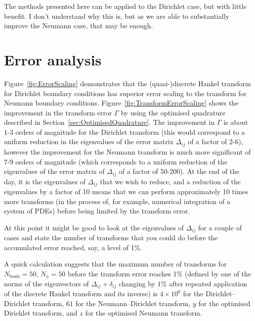 \documentclass[aip,amsmath,amssymb,reprint,twocolumn]{revtex4-1}
\newcommand{\Nbasis}{{N_{\text{basis}}}}
\newcommand{\Nx}{{N_{x}}}
\begin{document}
The methods presented here can be applied to the Dirichlet case, but with little benefit.  I don't understand why this is, but as we are able to substantially improve the Neumann case, that may be enough.



\section{Error analysis}
\label{sec:ErrorAnalysis}

Figure~\ref{fig:ErrorScaling} demonstrates that the (quasi-)discrete Hankel transform for Dirichlet boundary conditions has superior error scaling to the transform for Neumann boundary conditions.  Figure~\ref{fig:TransformErrorScaling} shows the improvement in the transform error $\Gamma$ by using the optimised quadrature described in Section~\ref{sec:OptimisedQuadrature}.  The improvement in $\Gamma$ is about 1-3 orders of magnitude for the Dirichlet transform (this would correspond to a uniform reduction in the eigenvalues of the error matrix $\Delta_{ij}$ of a factor of 2-6), however the improvement for the Neumann transform is much more significant of 7-9 orders of magnitude (which corresponds to a uniform reduction of the eigenvalues of the error matrix of $\Delta_{ij}$ of a factor of 50-200).  At the end of the day, it is the eigenvalues of $\Delta_{ij}$ that we wish to reduce, and a reduction of the eigenvalues by a factor of 10 means that we can perform approximately 10 times more transforms (in the process of, for example, numerical integration of a system of PDEs) before being limited by the transform error.

At this point it might be good to look at the eigenvalues of $\Delta_{ij}$ for a couple of cases and state the number of transforms that you could do before the accumulated error reached, say, a level of 1\%.

A quick calculation suggests that the maximum number of transforms for $\Nbasis=50$, $\Nx=50$ before the transform error reaches 1\% (defined by one of the norms of the eigenvectors of $\Delta_{ij} + \delta_{ij}$ changing by $1\%$ after repeated application of the discrete Hankel transform and its inverse) is $4 \times 10^6$ for the Dirichlet--Dirichlet transform, $61$ for the Neumann--Dirichlet transform, $y$ for the optimised Dirichlet transform, and $z$ for the optimised Neumann transform.
\end{document}
